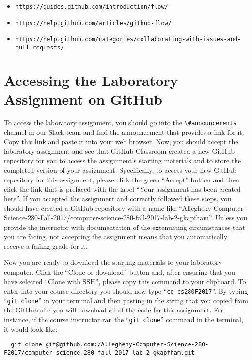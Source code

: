 \documentclass[11pt]{article}
\newcommand{\command}[1]{``\lstinline{#1}''}
\newcommand{\url}[1]{\lstinline{#1}}
\newcommand{\channel}[1]{\lstinline{#1}}
\begin{document}
\begin{itemize}
  \item \url{https://guides.github.com/introduction/flow/}
  \item \url{https://help.github.com/articles/github-flow/}
  \item \url{https://help.github.com/categories/collaborating-with-issues-and-pull-requests/}
\end{itemize}

\vspace*{-.5em}

\section*{Accessing the Laboratory Assignment on GitHub}

To access the laboratory assignment, you should go into the \channel{\#announcements} channel in our Slack team and find
the announcement that provides a link for it. Copy this link and paste it into your web browser. Now, you should accept
the laboratory assignment and see that GitHub Classroom created a new GitHub repository for you to access the
assignment's starting materials and to store the completed version of your assignment. Specifically, to access your new
GitHub repository for this assignment, please click the green ``Accept'' button and then click the link that is prefaced
with the label ``Your assignment has been created here''. If you accepted the assignment and correctly followed these
steps, you should have created a GitHub repository with a name like
``Allegheny-Computer-Science-280-Fall-2017/computer-science-280-fall-2017-lab-2-gkapfham''. Unless you provide the
instructor with documentation of the extenuating circumstances that you are facing, not accepting the assignment means
that you automatically receive a failing grade for it.

Now you are ready to download the starting materials to your laboratory computer. Click the ``Clone or download'' button
and, after ensuring that you have selected ``Clone with SSH'', please copy this command to your clipboard. To enter into
your course directory you should now type \command{cd cs280F2017}. By typing \command{git clone} in your terminal and then
pasting in the string that you copied from the GitHub site you will download all of the code for this assignment. For
instance, if the course instructor ran the \command{git clone} command in the terminal, it would look like:

\begin{lstlisting}
  git clone git@github.com:/Allegheny-Computer-Science-280-F2017/computer-science-280-fall-2017-lab-2-gkapfham.git
\end{lstlisting}
\end{document}
